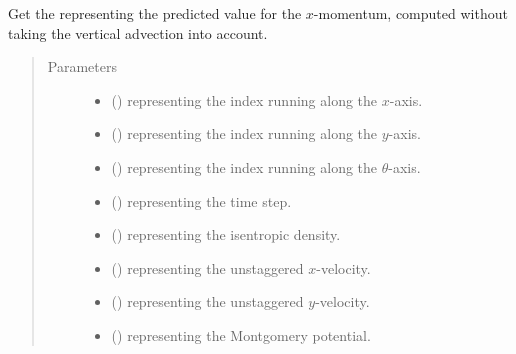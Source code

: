 \documentclass[letterpaper,10pt,english]{sphinxmanual}
\begin{document}
\begin{fulllineitems}
\begin{fulllineitems}
\label{\detokenize{api:tasmania.dycore.flux_isentropic_maccormack.FluxIsentropicMacCormack._get_maccormack_horizontal_predicted_value_U}}
Get the  representing the predicted value for the \(x\)-momentum,
computed without taking the vertical advection into account.
\begin{quote}\begin{description}
\item[{Parameters}] \leavevmode\begin{itemize}
\item {} 
 () \textendash{}  representing the index running along the \(x\)-axis.

\item {} 
 () \textendash{}  representing the index running along the \(y\)-axis.

\item {} 
 () \textendash{}  representing the index running along the \(\theta\)-axis.

\item {} 
 () \textendash{}  representing the time step.

\item {} 
 () \textendash{}  representing the isentropic density.

\item {} 
 () \textendash{}  representing the unstaggered \(x\)-velocity.

\item {} 
 () \textendash{}  representing the unstaggered \(y\)-velocity.

\item {} 
 () \textendash{}  representing the Montgomery potential.


\end{itemize}
\end{description}
\end{quote}
\end{fulllineitems}
\end{fulllineitems}
\end{document}
